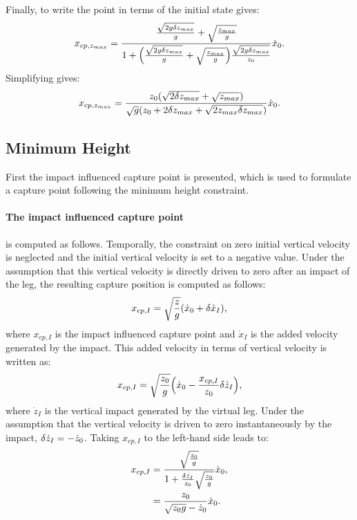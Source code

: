 Finally, to write the point in terms of the initial state gives:
\begin{equation}
 x_{cp,z_{max}}  = \frac{\frac{\sqrt{2g\delta z_{max}}}{g}+\sqrt{\frac{z_{max}}{g}}}{ 1+\Big(\frac{\sqrt{2g\delta z_{max}}}{g}+\sqrt{\frac{z_{max}}{g}}\Big)\frac{\sqrt{2g\delta z_{max}}}{z_0}}\dot{x}_0.
\end{equation}
Simplifying gives:
\begin{equation}
	 x_{cp,z_{max}} = \frac{z_0(\sqrt{2\delta{z_{max}}}+\sqrt{z_{max}})}{\sqrt{g}(z_0 + 2\delta{z_{max}} + \sqrt{2z_{max}\delta{z_{max}}})}\dot{x}_0.
\end{equation}
\subsection{Minimum Height}
First the impact influenced capture point is presented, which is used to formulate a capture point following the minimum height constraint.
\paragraph{The impact influenced capture point} is computed as follows. Temporally, the constraint on zero initial vertical velocity is neglected and the initial vertical velocity is set to a negative value. Under the assumption that this vertical velocity is directly driven to zero after an impact of the leg, the resulting capture position is computed as follows:
\begin{equation}
x_{cp,I} = \sqrt{\frac{z}{g}}(\dot{x}_0+\delta \dot{x}_I),
\end{equation}
where $x_{cp,I}$ is the impact influenced capture point and $\dot{x}_I$ is the added velocity generated by the impact. This added velocity in terms of vertical velocity is written as:
\begin{equation}
x_{cp,I} = \sqrt{\frac{z_0}{g}}\Big(\dot{x}_0-\frac{x_{cp,I}}{z_0}\delta \dot{z}_I\Big),
\end{equation}
where $\dot{z}_I$ is the vertical impact generated by the virtual leg. Under the assumption that the vertical velocity is driven to zero instantaneously by the impact, $\delta \dot{z}_I=-\dot{z}_0$. Taking $x_{cp,I}$ to the left-hand side leads to:
\begin{align}\label{eq:xcpimpact}
x_{cp,I} &= \frac{\sqrt{\frac{z_0}{g}}}{1+\frac{\delta \dot{z}_I}{z_0}\sqrt{\frac{z_0}{g}}}\dot{x}_0,\\
			&= \frac{z_0}{\sqrt{z_0g}-\dot{z}_0}\dot{x}_0.
\end{align}

